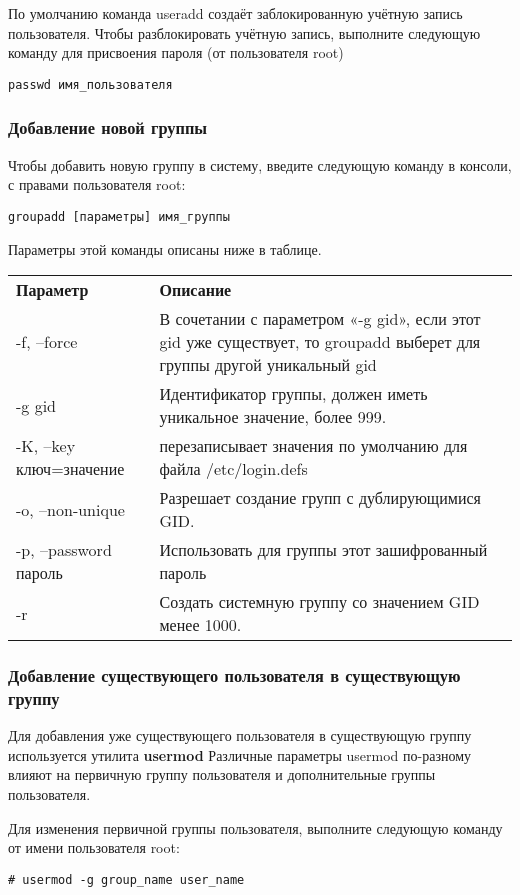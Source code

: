 \documentclass[a4paper,10pt,twoside]{article}
\begin{document}
По умолчанию команда useradd создаёт заблокированную учётную запись пользователя. Чтобы разблокировать учётную запись, выполните следующую команду для присвоения пароля (от пользователя root)

\begin{verbatim}
passwd имя_пользователя
\end{verbatim} 

\subsubsection{Добавление новой группы}
Чтобы добавить новую группу в систему, введите следующую команду в консоли, с правами пользователя root:
\begin{verbatim}
groupadd [параметры] имя_группы\end{verbatim} 

Параметры этой команды описаны ниже в таблице.

\begin{longtable}{  m{5cm}  m{12cm}  }  
 \textbf{Параметр} & \textbf{Описание}\\
-f, --force & В сочетании с параметром «-g gid», если этот gid уже существует, то groupadd выберет для группы другой уникальный gid\\
-g gid & Идентификатор группы, должен иметь уникальное значение, более 999.\\
-K, --key ключ=значение & перезаписывает значения по умолчанию для файла /etc/login.defs\\
-o, --non-unique & Разрешает создание групп с дублирующимися GID.\\
-p, --password пароль & Использовать для группы этот зашифрованный пароль\\
-r & Создать системную группу со значением GID менее 1000.\\
\end{longtable}

\subsubsection{Добавление существующего пользователя в существующую группу}
Для добавления уже существующего пользователя в существующую группу используется утилита \textbf{usermod}
Различные параметры usermod по-разному влияют на первичную группу пользователя и дополнительные группы пользователя.

Для изменения первичной группы пользователя, выполните следующую команду от имени пользователя root:
\begin{verbatim}
# usermod -g group_name user_name\end{verbatim} 
\end{document}
